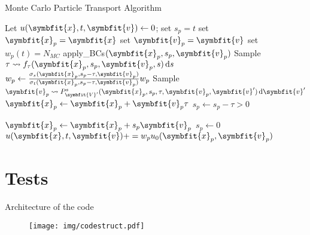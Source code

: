 \documentclass[aspectratio=1610]{beamer}
\newcommand{\bm}[1]{\symbfit{#1}}
\newcommand{\di}{\ensuremath{\, \mathrm{d}}}
\begin{document}
\begin{frame}[fragile]{Monte Carlo Particle Transport Algorithm}
	\setlength{\columnsep}{-1.5cm}
    \begin{multicols}{2}
    	\algrenewcommand\algorithmicindent{0.3em}%
        \begin{algorithmic}[1]
                \State Let $u(\bm{x}, t, \bm{v}) \gets 0$;
                    \State set $s_p = t$
                    \State set $\bm{x}_p = \bm{x}$
                    \State set $\bm{v}_p = \bm{v}$
                    \State set $w_p(t) = N_{MC}$
                        \If{$\bm{x}_p \not \in \mathcal{D}$}
                            \State apply\_BCs$(\bm{x}_p, s_p, \bm{v}_p)$
                        \EndIf
                        \State Sample $\tau \leadsto f_\tau(\bm{x}_p, s_p, \bm{v}_p, s) \di s$
                        \newcolumn
	                        \State $w_p \gets \frac{\sigma_s(\bm{x}_p, s_p - \tau, \bm{v}_p)}{\sigma_t(\bm{x}_p, s_p - \tau, \bm{v}_p)} w_p$
	                        \State Sample $\bm{v}_p \leadsto P_{\bm{V}'}^s(\bm{x}_p, s_p, \tau, \bm{v}_p, \bm{v}') \di \bm{v}'$
	                        \State $\bm{x}_p \gets \bm{x}_p + \bm{v}_p \tau$
	                        \State $s_p \gets s_p - \tau > 0$
                        
                        \Else
                            \State $\bm{x}_p \gets \bm{x}_p + s_p \bm{v}_p$
                            \State $s_p \gets 0$
                            \State $u(\bm{x}, t, \bm{v}) += w_p u_0(\bm{x}_p, \bm{v}_p)$
                        \EndIf
                    \EndWhile
                \EndFor
        \end{algorithmic}
    \end{multicols}
\end{frame}

\section{Tests}

\begin{frame}{Architecture of the code}
	\begin{figure}
		\centering
		\texttt{[image: img/codestruct.pdf]}
		\label{fig:code_structure}
	\end{figure}
\end{frame}
\end{document}

